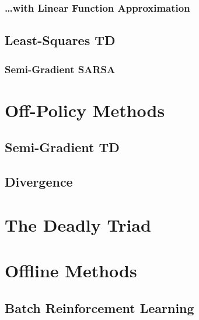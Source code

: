             \subsubsection{\dots with Linear Function Approximation} %

        \subsection{Least-Squares TD} %

            \subsubsection{Semi-Gradient SARSA} %

    \section{Off-Policy Methods} %

        \subsection{Semi-Gradient TD} %

        \subsection{Divergence} %

    \section{The Deadly Triad} %

    \section{Offline Methods} %

        \subsection{Batch Reinforcement Learning} %

